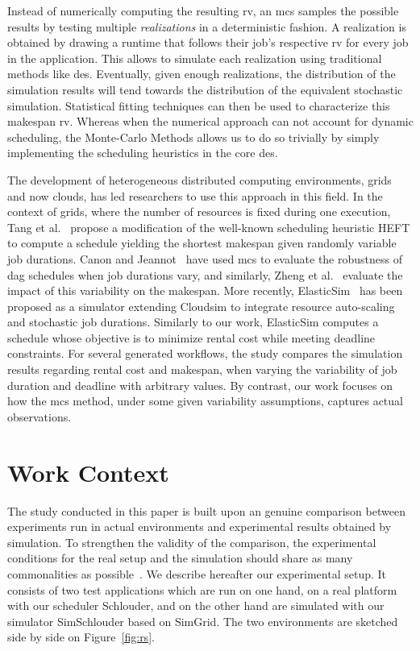 \documentclass[10pt,conference,compsocconf]{IEEEtran}
\begin{document}
Instead  of numerically computing  the resulting  \ac{rv}, an \ac{mcs} samples the possible
results by testing  multiple \emph{realizations} in a  deterministic fashion.  A
realization is obtained by drawing a runtime that follows their job's respective 
\ac{rv} for  every job in the  application. 
This allows to simulate each realization using traditional
methods like \ac{des}.  Eventually, given enough realizations, the distribution of
the simulation  results will  tend towards the  distribution of  the equivalent
stochastic  simulation.  Statistical  fitting  techniques can  then  be used  to
characterize this makespan \ac{rv}. Whereas when the numerical approach can not 
account for dynamic scheduling, the Monte-Carlo Methods allows us to do so 
trivially by simply implementing the scheduling heuristics in the core \ac{des}.

The development  of heterogeneous distributed computing  environments, grids and
now clouds,  has led  researchers to use  this approach in  this field.   In the
context of grids,  where the number of resources is  fixed during one execution,
Tang et  al.~\cite{Tang11} propose a  modification of the  well-known scheduling
heuristic  HEFT to  compute  a  schedule yielding  the  shortest makespan  given
randomly  variable job  durations. Canon and Jeannot~\cite{Canon10} have used  \ac{mcs} to
evaluate  the robustness  of \ac{dag}  schedules when  job durations  vary, and
similarly, Zheng et  al.~\cite{Zheng13} evaluate the impact  of this variability
on the makespan. More  recently, ElasticSim~\cite{Cai17} has been  proposed as a
simulator extending  Cloudsim to integrate resource  auto-scaling and stochastic
job  durations. Similarly  to our  work, ElasticSim  computes a  schedule whose
objective  is  to  minimize  rental  cost while meeting deadline
constraints.  For  several  generated workflows, the  study compares the  simulation results regarding  rental cost
and makespan,  when varying the variability  of job duration and  deadline with
arbitrary  values.  By  contrast,  our  work
focuses on how the \ac{mcs} method, under some given variability assumptions, 
captures actual observations.


\section{Work Context}
\label{sec:work-context}

The  study conducted  in this  paper  is built upon an genuine comparison  between
experiments  run in  actual environments  and experimental  results obtained  by
simulation.   To strengthen  the validity  of the  comparison, the  experimental
conditions  for  the  real  setup  and  the  simulation  should  share  as  many
commonalities  as   possible~\cite{PucherGWK15}.   We  describe   hereafter  our
experimental setup.  It consists of two  test applications which are  run on one
hand, on a real platform with our scheduler Schlouder, and on the other hand are
simulated  with   our  simulator  SimSchlouder   based  on  SimGrid.    The  two
environments are sketched side by side on Figure~\ref{fig:rs}.
\end{document}
